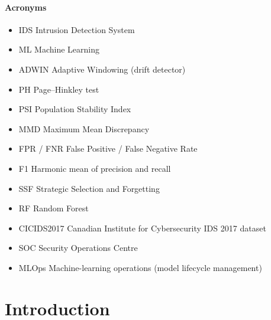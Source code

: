 \documentclass{article}
\begin{document}
	\pagebreak
	\renewcommand{\contentsname}{\textbf{Table Of Contents} }
	\renewcommand{\cfttoctitlefont}{\huge}
	\tableofcontents\thispagestyle{fancy}
	\setlength{\parindent}{4em}
	\setlength{\parskip}{1em}
	\renewcommand{\baselinestretch}{2.0}

	\clearpage
	\listoffigures
	\clearpage
	\listoftables
	\clearpage
	\paragraph{Acronyms}
	\begin{itemize}
		\item IDS \hspace{5em}Intrusion Detection System
		\item ML \hspace{5em}Machine Learning
		\item ADWIN \hspace{5em}Adaptive Windowing (drift detector)
		\item PH \hspace{5em}Page--Hinkley test
		\item PSI \hspace{5em}Population Stability Index
		\item MMD \hspace{5em}Maximum Mean Discrepancy
		\item FPR / FNR \hspace{5em}False Positive / False Negative Rate
		\item F1 \hspace{5em}Harmonic mean of precision and recall
		\item SSF \hspace{5em}Strategic Selection and Forgetting
		\item RF \hspace{5em}Random Forest
		\item CICIDS2017 \hspace{5em}Canadian Institute for Cybersecurity IDS 2017 dataset
		\item SOC \hspace{5em}Security Operations Centre
		\item MLOps \hspace{5em}Machine-learning operations (model lifecycle management)
	\end{itemize}

	\pagebreak
	\section{Introduction}
\end{document}
